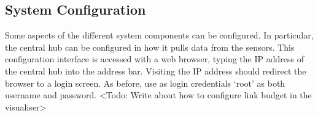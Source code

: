 \documentclass[../document.tex]{subfiles}
\begin{document}
\subsection{System Configuration}
Some aspects of the different system components can be configured. In particular, the central hub can be configured in how it pulls data from the sensors. This configuration interface is accessed with a web browser, typing the IP address of the central hub into the address bar. Visiting the IP address should redirect the browser to a login screen. As before, use as login credentials ‘root’ as both username and password.
{\color{red} <Todo: Write about how to configure link budget in the visualiser>}
\end{document}

